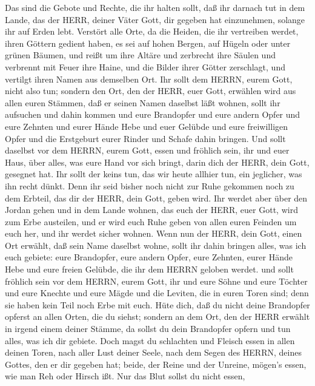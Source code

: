  Das sind die Gebote und Rechte, die ihr halten sollt, daß
ihr darnach tut in dem Lande, das der HERR, deiner Väter Gott, dir
gegeben hat einzunehmen, solange ihr auf Erden lebt. 
Verstört alle Orte, da die Heiden, die ihr vertreiben werdet, ihren
Göttern gedient haben, es sei auf hohen Bergen, auf Hügeln oder unter
grünen Bäumen,  und reißt um ihre Altäre und zerbrecht ihre
Säulen und verbrennt mit Feuer ihre Haine, und die Bilder ihrer Götter
zerschlagt, und vertilgt ihren Namen aus demselben Ort.  Ihr
sollt dem HERRN, eurem Gott, nicht also tun;  sondern den
Ort, den der HERR, euer Gott, erwählen wird aus allen euren Stämmen, daß
er seinen Namen daselbst läßt wohnen, sollt ihr aufsuchen und dahin
kommen  und eure Brandopfer und eure andern Opfer und eure
Zehnten und eurer Hände Hebe und euer Gelübde und eure freiwilligen
Opfer und die Erstgeburt eurer Rinder und Schafe dahin bringen.
 Und sollt daselbst vor dem HERRN, eurem Gott, essen und
fröhlich sein, ihr und euer Haus, über alles, was eure Hand vor sich
bringt, darin dich der HERR, dein Gott, gesegnet hat.  Ihr
sollt der keins tun, das wir heute allhier tun, ein jeglicher, was ihn
recht dünkt.  Denn ihr seid bisher noch nicht zur Ruhe
gekommen noch zu dem Erbteil, das dir der HERR, dein Gott, geben wird.
 Ihr werdet aber über den Jordan gehen und in dem Lande
wohnen, das euch der HERR, euer Gott, wird zum Erbe austeilen, und er
wird euch Ruhe geben von allen euren Feinden um euch her, und ihr werdet
sicher wohnen.  Wenn nun der HERR, dein Gott, einen Ort
erwählt, daß sein Name daselbst wohne, sollt ihr dahin bringen alles,
was ich euch gebiete: eure Brandopfer, eure andern Opfer, eure Zehnten,
eurer Hände Hebe und eure freien Gelübde, die ihr dem HERRN geloben
werdet.  und sollt fröhlich sein vor dem HERRN, eurem Gott,
ihr und eure Söhne und eure Töchter und eure Knechte und eure Mägde und
die Leviten, die in euren Toren sind; denn sie haben kein Teil noch Erbe
mit euch.  Hüte dich, daß du nicht deine Brandopfer opferst
an allen Orten, die du siehst;  sondern an dem Ort, den der
HERR erwählt in irgend einem deiner Stämme, da sollst du dein Brandopfer
opfern und tun alles, was ich dir gebiete.  Doch magst du
schlachten und Fleisch essen in allen deinen Toren, nach aller Lust
deiner Seele, nach dem Segen des HERRN, deines Gottes, den er dir
gegeben hat; beide, der Reine und der Unreine, mögen's essen, wie man
Reh oder Hirsch ißt.  Nur das Blut sollst du nicht essen,
